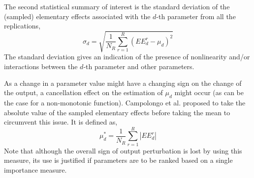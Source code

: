 The second statistical summary of interest is the standard deviation of the (sampled) elementary effects associated with the $d$-th parameter from all the replications,
\begin{equation}
	\sigma_d = \sqrt{\frac{1}{N_R} \sum_{r = 1}^{R} (EE^r_d - \mu_d)^2}
	\label{eq:sa_morris_sd}
\end{equation} 
The standard deviation gives an indication of the presence of nonlinearity and/or interactions between the $d$-th parameter and other parameters.

As a change in a parameter value might have a changing sign on the change of the output,
a cancellation effect on the estimation of $\mu_d$ might occur 
(as can be the case for a non-monotonic function).
Campolongo et al. \cite{Campolongo2011} proposed to take the absolute value of the sampled elementary effects before taking the mean to circumvent this issue.
It is defined as,
\begin{equation}
	\mu^*_d = \frac{1}{N_R} \sum_{r = 1}^{R} |EE^r_d|
	\label{eq:sa_morris_mustar}
\end{equation}
Note that although the overall sign of output perturbation is lost by using this measure,
its use is justified if parameters are to be ranked based on a single importance measure.

